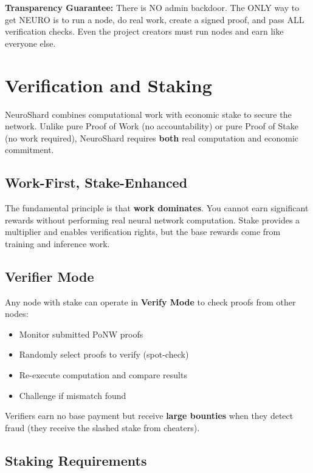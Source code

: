 \documentclass[11pt,a4paper]{article}
\begin{document}
\textbf{Transparency Guarantee:} There is NO admin backdoor. The ONLY way to get NEURO is to run a node, do real work, create a signed proof, and pass ALL verification checks. Even the project creators must run nodes and earn like everyone else.

\section{Verification and Staking}
\label{sec:verification}

NeuroShard combines computational work with economic stake to secure the network. Unlike pure Proof of Work (no accountability) or pure Proof of Stake (no work required), NeuroShard requires \textbf{both} real computation and economic commitment.

\subsection{Work-First, Stake-Enhanced}

The fundamental principle is that \textbf{work dominates}. You cannot earn significant rewards without performing real neural network computation. Stake provides a multiplier and enables verification rights, but the base rewards come from training and inference work.

\subsection{Verifier Mode}

Any node with stake can operate in \textbf{Verify Mode} to check proofs from other nodes:

\begin{itemize}
    \item Monitor submitted PoNW proofs
    \item Randomly select proofs to verify (spot-check)
    \item Re-execute computation and compare results
    \item Challenge if mismatch found
\end{itemize}

Verifiers earn no base payment but receive \textbf{large bounties} when they detect fraud (they receive the slashed stake from cheaters).

\subsection{Staking Requirements}
\end{document}
